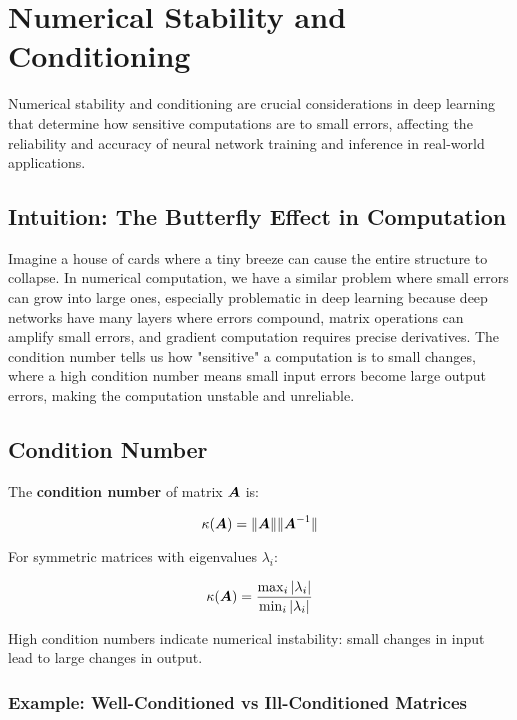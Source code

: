 
\section{Numerical Stability and Conditioning }
\label{sec:numerical-stability}

Numerical stability and conditioning are crucial considerations in deep learning that determine how sensitive computations are to small errors, affecting the reliability and accuracy of neural network training and inference in real-world applications.

\subsection{Intuition: The Butterfly Effect in Computation}

Imagine a house of cards where a tiny breeze can cause the entire structure to collapse. In numerical computation, we have a similar problem where small errors can grow into large ones, especially problematic in deep learning because deep networks have many layers where errors compound, matrix operations can amplify small errors, and gradient computation requires precise derivatives. The condition number tells us how "sensitive" a computation is to small changes, where a high condition number means small input errors become large output errors, making the computation unstable and unreliable.

\subsection{Condition Number}

The \textbf{condition number} of matrix $\boldsymbol{A}$ is:

\begin{equation}
\kappa(\boldsymbol{A}) = \|\boldsymbol{A}\| \|\boldsymbol{A}^{-1}\|
\end{equation}

For symmetric matrices with eigenvalues $\lambda_i$:

\begin{equation}
\kappa(\boldsymbol{A}) = \frac{\max_i |\lambda_i|}{\min_i |\lambda_i|}
\end{equation}

High condition numbers indicate numerical instability: small changes in input lead to large changes in output.

\subsubsection{Example: Well-Conditioned vs Ill-Conditioned Matrices}


